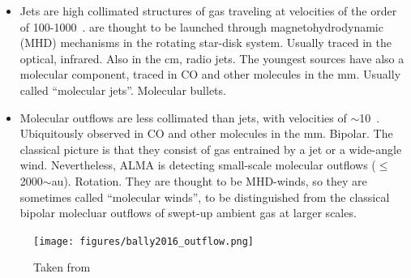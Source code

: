 \documentclass[12pt]{mythesis}
\begin{document}
\begin{itemize}
	\item Jets are high collimated structures of gas traveling at velocities of the order of 100-1000~\kms.
are thought to be launched through magnetohydrodynamic (MHD) mechanisms in the rotating star-disk system. Usually traced in the optical, infrared. Also in the cm, radio jets. The youngest sources have also a molecular component, traced in CO and other molecules in the mm. Usually called ``molecular jets''. Molecular bullets. %

 \item Molecular outflows are less collimated than jets, with velocities of $\sim$10~\kms. Ubiquitously observed in CO and other molecules in the mm. Bipolar. The classical picture is that they consist of gas entrained by a jet or a wide-angle wind. Nevertheless, ALMA is detecting small-scale molecular outflows ($\leq$2000$\sim$au). Rotation. They are thought to be MHD-winds, so they are sometimes called ``molecular winds'', to be distinguished from the classical bipolar molecluar outflows of swept-up ambient gas at larger scales.

 \end{itemize}
\begin{figure}[t]
	\begin{center}
		\texttt{[image: figures/bally2016\_outflow.png]}
		\caption[Outflow and jet scheme]{Taken from \citet{bally2016}}
	\end{center}
\end{figure}



\end{document}
